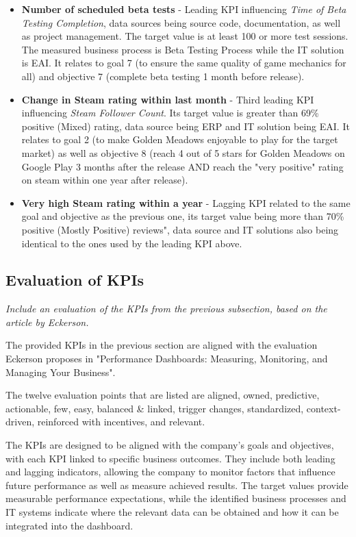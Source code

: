 \documentclass{article}
\begin{document}
\begin{itemize}
\item \textbf{Number of scheduled beta tests} - Leading KPI influencing \textit{Time of Beta Testing Completion}, data sources being source code, documentation, as well as project management. The target value is at least 100 or more test sessions. The measured business process is Beta Testing Process while the IT solution is EAI. It relates to goal 7 (to ensure the same quality of game mechanics for all) and objective 7 (complete beta testing 1 month before release).

\item \textbf{Change in Steam rating within last month} - Third leading KPI influencing \textit{Steam Follower Count}. Its target value is greater than 69\% positive (Mixed) rating, data source being ERP and IT solution being EAI. It relates to goal 2 (to make Golden Meadows enjoyable to play for the target market) as well as objective 8 (reach 4 out of 5 stars for Golden Meadows on Google Play 3 months after the release AND reach the "very positive" rating on steam within one year after release).

\item \textbf{Very high Steam rating within a year} - Lagging KPI related to the same goal and objective as the previous one, its target value being more than 70\% positive (Mostly Positive) reviews", data source and IT solutions also being identical to the ones used by the leading KPI above.
\end{itemize}


\subsection{Evaluation of KPIs}
\textit{
Include an evaluation of the KPIs from the previous subsection, based on the
article by Eckerson.
}

The provided KPIs in the previous section are aligned with the evaluation Eckerson proposes in "Performance Dashboards: Measuring, Monitoring, and Managing Your Business".

The twelve evaluation points that are listed are aligned, owned, predictive, actionable, few, easy, balanced \& linked, trigger changes, standardized, context-driven, reinforced with incentives, and relevant.

The KPIs are designed to be aligned with the company's goals and objectives, with each KPI linked to specific business outcomes. They include both leading and lagging indicators, allowing the company to monitor factors that influence future performance as well as measure achieved results. The target values provide measurable performance expectations, while the identified business processes and IT systems indicate where the relevant data can be obtained and how it can be integrated into the dashboard.
\end{document}
